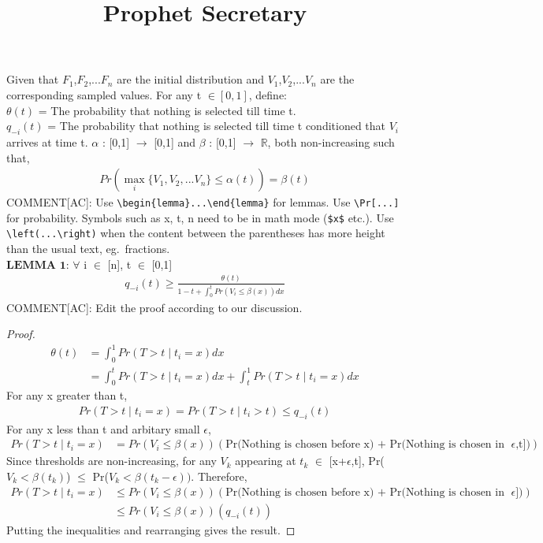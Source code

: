 \documentclass[12pt, letterpaper, twoside]{article}
\title{Prophet Secretary}
\begin{document}
\maketitle
Given that $F_{1}$,$F_{2}$,...$F_{n}$ are the initial distribution and $V_{1}$,$V_{2}$,...$V_{n}$ are the corresponding sampled values. For any t $\in [0,1] $, define:\\
$\theta(t)$ = The probability that nothing is selected till time t.\\
$q_{-i}(t)$ = The probability that nothing is selected till time t conditioned that $V_{i}$ arrives at time t.
$\alpha$ : [0,1] $\rightarrow$ [0,1] and $\beta$ : [0,1] $\rightarrow$ $\mathbb{R}$, both non-increasing such that,
\begin{align*}
Pr(\max_{i} \{V_{1},V_{2},...V_{n}\} \leq \alpha(t)) = \beta(t)
\end{align*}
COMMENT[AC]: Use \verb|\begin{lemma}...\end{lemma}| for lemmas. Use \verb|\Pr[...]| for probability. Symbols such as x, t, n need to be in math mode (\verb|$x$| etc.). Use \verb|\left(...\right)| when the content between the parentheses has more height than the usual text, eg.\ fractions.\\
$\textbf{LEMMA 1:}$ $\forall$ i $\in$ [n], t $\in$ [0,1]
\begin{align*}
q_{-i}(t) \geq \frac{\theta(t)}{1-t+\int_{0}^{t} Pr(V_{i} \leq \beta(x))  dx}
\end{align*}
COMMENT[AC]: Edit the proof according to our discussion.\\
\begin{proof}
\begin{align*}
\theta(t) &= \int_{0}^{1} Pr(T > t \mid t_{i} = x) dx\\
&= \int_{0}^{t} Pr(T > t \mid t_{i} = x) dx + \int_{t}^{1} Pr(T > t \mid t_{i} = x) dx
\end{align*}
For any x greater than t,
\begin{align*}
Pr(T > t \mid t_{i} = x) = Pr(T > t \mid t_{i} > t) \leq q_{-i}(t)
\end{align*}
For any x less than t and arbitary small $\epsilon$,
\begin{align*}
Pr(T > t \mid t_{i} = x) &= Pr(V_{i} \leq \beta(x)) (\text{Pr(Nothing is chosen before x) + Pr(Nothing is chosen in [x+$\epsilon$,t])})
\end{align*}
Since thresholds are non-increasing, for any $V_{k}$ appearing at $t_{k}$ $\in$ [x+$\epsilon$,t], Pr($V_{k} < \beta(t_{k})$) $\leq$ Pr($V_{k} < \beta(t_{k}-\epsilon))$. Therefore,
\begin{align*}
Pr(T > t \mid t_{i} = x) &\leq Pr(V_{i} \leq \beta(x)) (\text{Pr(Nothing is chosen before x) + Pr(Nothing is chosen in [x,t-$\epsilon$])})\\
&\leq Pr(V_{i} \leq \beta(x)) (q_{-i}(t))
\end{align*}
Putting the inequalities and rearranging gives the result.
\end{proof}
\end{document}

